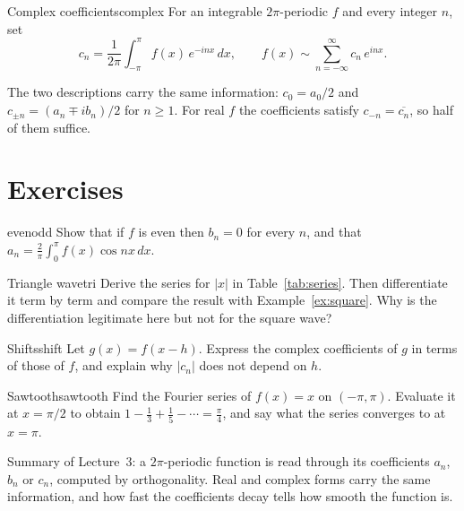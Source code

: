 \documentclass[11pt]{article}
\begin{document}
\begin{definition}{Complex coefficients}{complex}
For an integrable $2\pi$-periodic $f$ and every integer $n$, set
\[
  c_n = \frac{1}{2\pi}\int_{-\pi}^{\pi} f(x)\,e^{-inx}\,dx,
  \qquad
  f(x) \sim \sum_{n=-\infty}^{\infty} c_n\,e^{inx}.
\]
\end{definition}

The two descriptions carry the same information: $c_0=a_0/2$ and
$c_{\pm n} = (a_n \mp i b_n)/2$ for $n\ge1$. For real $f$ the coefficients
satisfy $c_{-n}=\overline{c_n}$, so half of them suffice.

\section{Exercises}

\begin{exercise}{}{evenodd}
Show that if $f$ is even then $b_n=0$ for every $n$, and that
$a_n=\frac{2}{\pi}\int_0^\pi f(x)\cos nx\,dx$.
\end{exercise}

\begin{exercise}{Triangle wave}{tri}
Derive the series for $|x|$ in Table~\ref{tab:series}. Then differentiate it term
by term and compare the result with Example~\ref{ex:square}. Why is the
differentiation legitimate here but not for the square wave?
\end{exercise}

\begin{exercise}{Shifts}{shift}
Let $g(x)=f(x-h)$. Express the complex coefficients of $g$ in terms of those
of $f$, and explain why $|c_n|$ does not depend on $h$.
\end{exercise}

\begin{exercise}{Sawtooth}{sawtooth}
Find the Fourier series of $f(x)=x$ on $(-\pi,\pi)$. Evaluate it at
$x=\pi/2$ to obtain $1-\frac13+\frac15-\cdots=\frac{\pi}{4}$, and say what the
series converges to at $x=\pi$.
\end{exercise}

\begin{keyidea}
Summary of Lecture~3: a $2\pi$-periodic function is read through its
coefficients $a_n$, $b_n$ or $c_n$, computed by orthogonality. Real and
complex forms carry the same information, and how fast the coefficients decay
tells how smooth the function is.
\end{keyidea}

\end{document}
